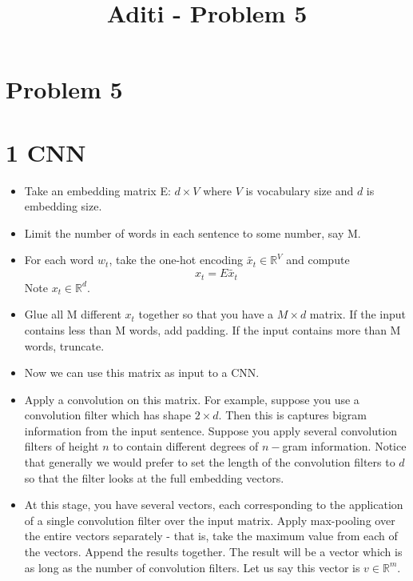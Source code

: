 \documentclass[a4paper]{article}
\title{Aditi - Problem 5}
\begin{document}
\maketitle

\section*{Problem 5}

\section*{1 CNN}
\begin{itemize}
\item{Take an embedding matrix E: $d \times V$ where $V$ is vocabulary size and $d$ is embedding size.}

\item{Limit the number of words in each sentence to some number, say M.}

\item{For each word $w_t$, take the one-hot encoding $\tilde{x_t} \in \mathbb{R}^{V}$ and compute 
$$x_t = E \tilde{x_t} $$
Note $x_t \in \mathbb{R}^d$.}

\item{Glue all M different $x_t$ together so that you have a $M \times d$ matrix. If the input contains less than M words, add padding. If the input contains more than M words, truncate.}

\item{Now we can use this matrix as input to a CNN.}

\item{Apply a convolution on this matrix. For example, suppose you use a convolution filter which has shape $2 \times d$. Then this is captures bigram information from the input sentence. Suppose you apply several convolution filters of height $n$ to contain different degrees of $n-$gram information. Notice that generally we would prefer to set the length of the convolution filters to $d$ so that the filter looks at the full embedding vectors.} 

\item{At this stage, you have several vectors, each corresponding to the application of a single convolution filter over the input matrix. Apply max-pooling over the entire vectors separately - that is, take the maximum value from each of the vectors. Append the results together. The result will be a vector which is as long as the number of convolution filters. Let us say this vector is $v \in \mathbb{R}^m$.}


\end{itemize}
\end{document}

